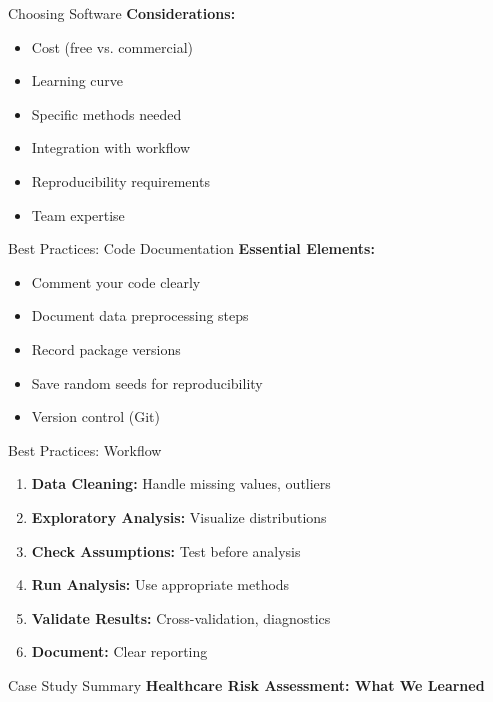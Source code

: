 \documentclass[aspectratio=169,ignorenonframetext]{beamer}
\begin{document}
\begin{frame}{Choosing Software}
\textbf{Considerations:}

\begin{itemize}
\item
  Cost (free vs. commercial)
\item
  Learning curve
\item
  Specific methods needed
\item
  Integration with workflow
\item
  Reproducibility requirements
\item
  Team expertise
\end{itemize}
\end{frame}

\begin{frame}{Best Practices: Code Documentation}
\textbf{Essential Elements:}

\begin{itemize}
\item
  Comment your code clearly
\item
  Document data preprocessing steps
\item
  Record package versions
\item
  Save random seeds for reproducibility
\item
  Version control (Git)
\end{itemize}
\end{frame}

\begin{frame}{Best Practices: Workflow}
\begin{enumerate}
\item
  \textbf{Data Cleaning:} Handle missing values, outliers
\item
  \textbf{Exploratory Analysis:} Visualize distributions
\item
  \textbf{Check Assumptions:} Test before analysis
\item
  \textbf{Run Analysis:} Use appropriate methods
\item
  \textbf{Validate Results:} Cross-validation, diagnostics
\item
  \textbf{Document:} Clear reporting
\end{enumerate}
\end{frame}

\begin{frame}{Case Study Summary}
\textbf{Healthcare Risk Assessment: What We Learned}
\end{frame}
\end{document}
